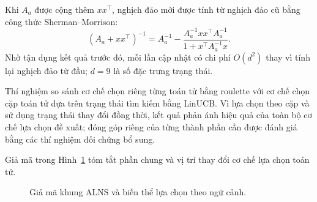 \documentclass[11pt,a4paper]{article}
\begin{document}
Khi $A_a$ được cộng thêm $xx^\top$, nghịch đảo mới được tính từ nghịch đảo cũ bằng công thức Sherman--Morrison:
\[
 (A_a+xx^\top)^{-1}=A_a^{-1}-\frac{A_a^{-1}xx^\top A_a^{-1}}{1+x^\top A_a^{-1}x}.
\]
Nhờ tận dụng kết quả trước đó, mỗi lần cập nhật có chi phí $O(d^2)$ thay vì tính lại nghịch đảo từ đầu; $d=9$ là số đặc trưng trạng thái.

Thí nghiệm so sánh cơ chế chọn riêng từng toán tử bằng roulette với cơ chế chọn cặp toán tử dựa trên trạng thái tìm kiếm bằng LinUCB. Vì lựa chọn theo cặp và sử dụng trạng thái thay đổi đồng thời, kết quả phản ánh hiệu quả của toàn bộ cơ chế lựa chọn đề xuất; đóng góp riêng của từng thành phần cần được đánh giá bằng các thí nghiệm đối chứng bổ sung.

Giả mã trong Hình~\ref{fig:alns-pseudocode} tóm tắt phần chung và vị trí thay đổi cơ chế lựa chọn toán tử.

\begin{figure}[htbp]
\centering
{}
\caption{Giả mã khung ALNS và biến thể lựa chọn theo ngữ cảnh.}
\label{fig:alns-pseudocode}
\end{figure}
\end{document}
